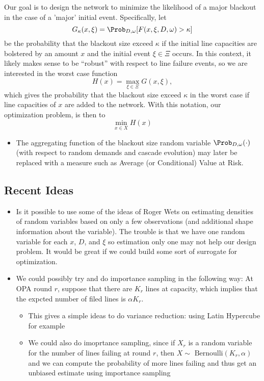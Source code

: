Our goal is to design the network to minimize the likelihood of a
major blackout in the case of a 'major' initial event. 
Specifically, let 
\[ G_\kappa(x,\xi) = \Prob_{D,\omega} [F(x,\xi,D,\omega) > \kappa] \]
be the probability that the blackout size exceed $\kappa$ if the
initial line capacities are bolstered by an amount $x$ and the initial
event $\xi \in \Xi$ occurs.   In this context, it likely makes sense
to be ``robust'' with respect to line failure events, so we are
interested in the worst case function
\[ H(x) = \max_{\xi \in \Xi} G(x,\xi), \]
which gives the  probability that the blackout size exceed $\kappa$ in
the worst case if line capacities of $x$ are added to the network. 
With this notation, our optimization problem, is then to 
\[ \min_{x \in X} H(x) \]

\begin{itemize}
\item The aggregating function of the blackout size random variable
$\Prob_{D,\omega}(\cdot)$ (with respect to random demands and cascade
evolution) may 
later be replaced with a measure such as Average (or Conditional)
Value at Risk.
\end{itemize}


\subsection{Recent Ideas}

\begin{itemize}
\item Is it possible to use some of the ideas of Roger Wets on
  estimating densities of random variables based on only a few
  observations (and additional shape information about the variable).
  The trouble is that we have one random variable for each $x$, $D$,
  and $\xi$ so estimation only one may not help our design problem.
  It would be great if we could build some sort of surrogate for
  optimization. 
\item We could possibly try and do importance sampling in the
  following way: At OPA round $r$, suppose that there are $K_r$ lines
  at capacity, which implies that the expcted number of filed lines is
  $\alpha K_r$. 
\begin{itemize}
\item This gives a simple ideas to do variance reduction: using Latin
  Hypercube for example
\item We could also do imoprtance sampling, since if $X_r$ is a random
  variable for the number of lines failing at round $r$, then $X \sim
  \mbox{ Bernoulli}(K_r, \alpha)$ and we can compute the probability
  of more lines failing and thus get an unbiased estimate using
  importance sampling
\end{itemize}
\end{itemize}

